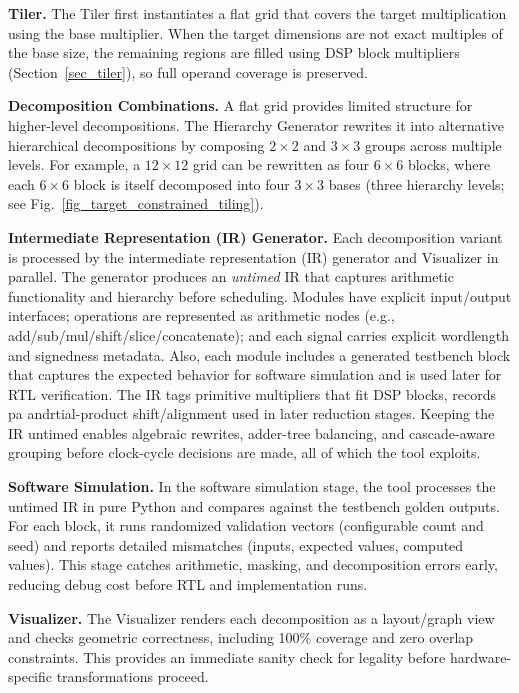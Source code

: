 \documentclass[sigconf,9pt,review]{acmart}
\begin{document}
\noindent\textbf{Tiler.}
The Tiler first instantiates a flat grid that covers the target multiplication using the base multiplier.
When the target dimensions are not exact multiples of the base size, the remaining regions are filled using DSP block multipliers (Section~\ref{sec_tiler}), so full operand coverage is preserved.

\noindent\textbf{Decomposition Combinations.}
A flat grid provides limited structure for higher-level decompositions.
The Hierarchy Generator rewrites it into alternative hierarchical decompositions by composing $2\times 2$ and $3\times 3$ groups across multiple levels.
For example, a $12\times 12$ grid can be rewritten as four $6\times 6$ blocks, where each $6\times 6$ block is itself decomposed into four $3\times 3$ bases (three hierarchy levels; see Fig.~\ref{fig_target_constrained_tiling}).

\noindent\textbf{Intermediate Representation (IR) Generator.}
Each decomposition variant is processed by the intermediate representation (IR) generator and Visualizer in parallel.
The generator produces an \emph{untimed} IR that captures arithmetic functionality and hierarchy before scheduling.
Modules have explicit input/output interfaces; operations are represented as arithmetic nodes (e.g., add/sub/mul/shift/slice/concatenate); and each signal carries explicit wordlength and signedness metadata.
Also, each module includes a generated testbench block that captures the expected behavior for software simulation and is used later for RTL verification.
The IR tags primitive multipliers that fit DSP blocks, records pa andrtial-product shift/alignment used in later reduction stages.
Keeping the IR untimed enables algebraic rewrites, adder-tree balancing, and cascade-aware grouping before clock-cycle decisions are made, all of which the tool exploits.

\noindent\textbf{Software Simulation.}
In the software simulation stage, the tool processes the untimed IR in pure Python and compares against the testbench golden outputs.
For each block, it runs randomized validation vectors (configurable count and seed) and reports detailed mismatches (inputs, expected values, computed values).
This stage catches arithmetic, masking, and decomposition errors early, reducing debug cost before RTL and implementation runs.

\noindent\textbf{Visualizer.}
The Visualizer renders each decomposition as a layout/graph view and checks geometric correctness, including 100\% coverage and zero overlap constraints.
This provides an immediate sanity check for legality before hardware-specific transformations proceed.
\end{document}
